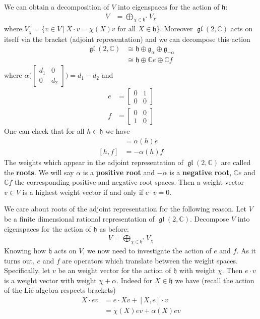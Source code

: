 \documentclass[manuscript, printscheme]{aomart}
\theoremstyle{plain} %
\theoremstyle{definition}
\theoremstyle{remark}
\newcommand{\st}{\ \vert \ }
\newcommand{\C}{\mathbb{C}}
\newcommand{\mf}[1]{\mathfrak{#1}}
\DeclareMathOperator{\gl}{\mf{gl}}
\begin{document}
\hfill

We can obtain a decomposition of $V$ into eigenspaces for the action of $\mf h$: \begin{align*}
	V & = \bigoplus_{\chi\in \mf h^*} V_\chi
\end{align*} where $V_\chi = \{v\in V \st X\cdot v = \chi(X)v \text{ for all $X\in \mf h$}\}$. Moreover
$\gl(2,\C)$ acts on itself via the bracket (adjoint representation) and we can
decompose this action \begin{align*}
	\gl(2,\C) & \cong \mf h \oplus \mf g_{\alpha} \oplus \mf g_{-\alpha} \\
	          & \cong \mf h \oplus \C e \oplus \C f
\end{align*} where $\alpha\bigg(\begin{bmatrix}
			d_1 & 0   \\
			0   & d_2
		\end{bmatrix}\bigg) = d_1 - d_2$ and \begin{align*}
	e & = \begin{bmatrix}
		      0 & 1 \\
		      0 & 0
	      \end{bmatrix} \\
	f & = \begin{bmatrix}
		      0 & 0 \\
		      1 & 0
	      \end{bmatrix}
\end{align*} One can check that for all $h\in \mf h$ we have  \begin{align*}
	[h, e] & = \alpha(h)e \\ [h, f] &= -\alpha(h)f
\end{align*} The weights which appear in the adjoint representation of $\gl(2,\C)$ are called the \textbf{roots}.
We will say $\alpha$ is a \textbf{positive root} and $-\alpha$ is a \textbf{negative root}, $\C e$ and $\C f$ the corresponding positive and negative root spaces.
Then a weight vector $v\in V$ is a highest weight vector if and only if $e\cdot v = 0$.

\hfill

We care about roots of the adjoint representation for the following reason. Let $V$ be a finite dimensional rational representation of $\gl(2,\C)$.
Decompose $V$ into eigenspaces for the action of $\mf h$ as before: \begin{align*}
	V = \bigoplus_{\chi \in \mf h^*} V_\chi
\end{align*} Knowing how $\mf h$ acts on $V$, we now need to investigate the action of $e$ and $f$. As it turns out,
$e$ and $f$ are operators which translate between the weight spaces.
Specifically, let $v$ be an weight vector for the action of $\mf h$ with weight $\chi$.
Then $e\cdot v$ is a weight vector with weight $\chi + \alpha$. Indeed for $X\in \mf h$ we have (recall the action of the Lie algebra respects brackets)
\begin{align*}
	X\cdot ev & = e \cdot Xv + [X,e]\cdot v \\
	          & = \chi(X)ev + \alpha(X)ev
\end{align*}
\end{document}
